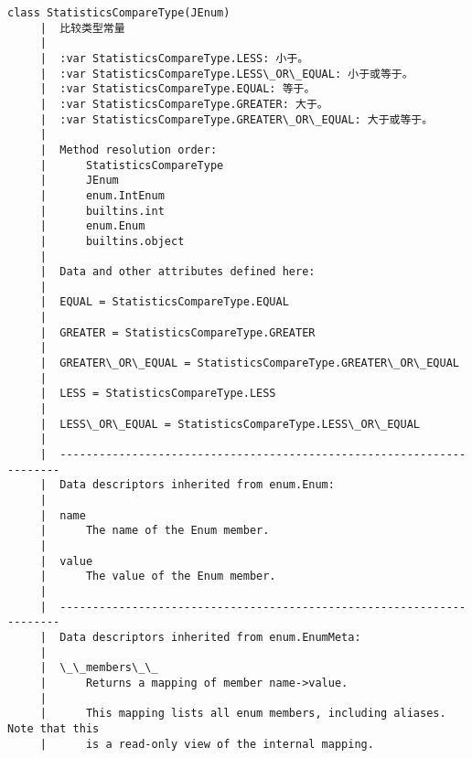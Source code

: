 \documentclass[11pt]{article}
\begin{document}
\begin{Verbatim}[commandchars=\\\{\}]
    class StatisticsCompareType(JEnum)
     |  比较类型常量
     |  
     |  :var StatisticsCompareType.LESS: 小于。
     |  :var StatisticsCompareType.LESS\_OR\_EQUAL: 小于或等于。
     |  :var StatisticsCompareType.EQUAL: 等于。
     |  :var StatisticsCompareType.GREATER: 大于。
     |  :var StatisticsCompareType.GREATER\_OR\_EQUAL: 大于或等于。
     |  
     |  Method resolution order:
     |      StatisticsCompareType
     |      JEnum
     |      enum.IntEnum
     |      builtins.int
     |      enum.Enum
     |      builtins.object
     |  
     |  Data and other attributes defined here:
     |  
     |  EQUAL = StatisticsCompareType.EQUAL
     |  
     |  GREATER = StatisticsCompareType.GREATER
     |  
     |  GREATER\_OR\_EQUAL = StatisticsCompareType.GREATER\_OR\_EQUAL
     |  
     |  LESS = StatisticsCompareType.LESS
     |  
     |  LESS\_OR\_EQUAL = StatisticsCompareType.LESS\_OR\_EQUAL
     |  
     |  ----------------------------------------------------------------------
     |  Data descriptors inherited from enum.Enum:
     |  
     |  name
     |      The name of the Enum member.
     |  
     |  value
     |      The value of the Enum member.
     |  
     |  ----------------------------------------------------------------------
     |  Data descriptors inherited from enum.EnumMeta:
     |  
     |  \_\_members\_\_
     |      Returns a mapping of member name->value.
     |      
     |      This mapping lists all enum members, including aliases. Note that this
     |      is a read-only view of the internal mapping.
    

\end{Verbatim}
\end{document}
